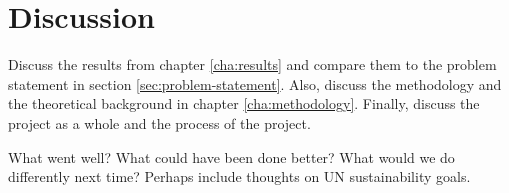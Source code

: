\chapter{Discussion}\label{cha:discussion}
Discuss the results from chapter \ref{cha:results} and compare them to the problem statement in section \ref{sec:problem-statement}. Also, discuss the methodology and the theoretical background in chapter \ref{cha:methodology}. Finally, discuss the project as a whole and the process of the project.

What went well? What could have been done better? What would we do differently next time? Perhaps include thoughts on UN sustainability goals.